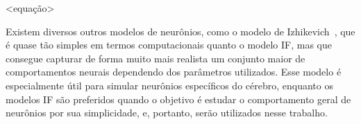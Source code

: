 <equação>

Existem diversos outros modelos de neurônios, como o modelo de Izhikevich~\cite{izhikevichSimple2003}, que é quase tão simples em
termos computacionais quanto o modelo IF, mas que consegue capturar de forma muito mais realista um conjunto maior de
comportamentos neurais dependendo dos parâmetros utilizados. Esse modelo é especialmente útil para simular neurônios específicos
do cérebro, enquanto os modelos IF são preferidos quando o objetivo é estudar o comportamento geral de neurônios por sua
simplicidade, e, portanto, serão utilizados nesse trabalho.
